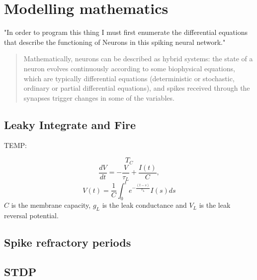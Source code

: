 \section{Modelling mathematics}
"In order to program this thing I must first enumerate the differential equations
that describe the functioning of Neurons in this spiking neural network."

\begin{quote}
    Mathematically, neurons can be described as hybrid systems: the state of a
    neuron evolves continuously according to some biophysical equations, which
    are typically differential equations (deterministic or stochastic, ordinary
    or partial differential equations), and spikes received through the synapses
    trigger changes in some of the variables. \autocite{brette_simulation_2007} 
\end{quote}


\subsection{Leaky Integrate and Fire}

TEMP:
\begin{figure*}[h]
    \centering
    \begin{equation}\label{eq:LIF_TC}
        T_C
    \end{equation}
    \begin{equation}\label{eq:LIF_RC}
        \frac{d V}{d t} = -\frac{V}{\tau_L} + \frac{I(t)}{C},
    \end{equation}
    \begin{equation}\label{eq:integ_LIF_RC_VL}
        V(t)= \frac{1}{C} \int_{0}^{t} e^{-\frac{(t-s)}{\tau_L}} I(s) ds
    \end{equation}
    $C$ is the membrane capacity, $g_L$ is the leak conductance and $V_L$ is the leak reversal potential.
    \label{LIFequation}
\end{figure*}

\subsection{Spike refractory periods}

\subsection{STDP}